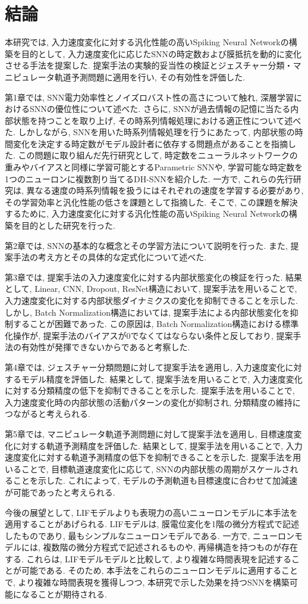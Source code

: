 \cleardoublepage %
\chapter{結論}

本研究では, 入力速度変化に対する汎化性能の高いSpiking Neural Networkの構築を目的として, 入力速度変化に応じたSNNの時定数および膜抵抗を動的に変化させる手法を提案した.
提案手法の実験的妥当性の検証とジェスチャー分類・マニピュレータ軌道予測問題に適用を行い, その有効性を評価した.

第1章では, SNN電力効率性とノイズロバスト性の高さについて触れ, 深層学習におけるSNNの優位性について述べた.
さらに, SNNが過去情報の記憶に当たる内部状態を持つことを取り上げ, その時系列情報処理における適正性について述べた.
しかしながら, SNNを用いた時系列情報処理を行うにあたって, 内部状態の時間変化を決定する時定数がモデル設計者に依存する問題点があることを指摘した.
この問題に取り組んだ先行研究として, 時定数をニューラルネットワークの重みやバイアスと同様に学習可能とするParametric SNNや, 学習可能な時定数を1つのニューロンに複数割り当てるDH-SNNを紹介した.
一方で, これらの先行研究は, 異なる速度の時系列情報を扱うにはそれぞれの速度を学習する必要があり, その学習効率と汎化性能の低さを課題として指摘した.
そこで, この課題を解決するために, 入力速度変化に対する汎化性能の高いSpiking Neural Networkの構築を目的とした研究を行った.

第2章では, SNNの基本的な概念とその学習方法について説明を行った.
また, 提案手法の考え方とその具体的な定式化について述べた.

第3章では, 提案手法の入力速度変化に対する内部状態変化の検証を行った.
結果として, Linear, CNN, Dropout, ResNet構造において, 提案手法を用いることで, 入力速度変化に対する内部状態ダイナミクスの変化を抑制できることを示した.
しかし, Batch Normalization構造においては, 提案手法による内部状態変化を抑制することが困難であった.
この原因は, Batch Normalization構造における標準化操作が, 提案手法のバイアスが0でなくてはならない条件と反しており, 提案手法の有効性が発揮できないからであると考察した.

第4章では, ジェスチャー分類問題に対して提案手法を適用し, 入力速度変化に対するモデル精度を評価した.
結果として, 提案手法を用いることで, 入力速度変化に対する分類精度の低下を抑制できることを示した.
提案手法を用いることで, 入力速度変化時の内部状態の活動パターンの変化が抑制され, 分類精度の維持につながると考えられる.

第5章では, マニピュレータ軌道予測問題に対して提案手法を適用し, 目標速度変化に対する軌道予測精度を評価した.
結果として, 提案手法を用いることで, 入力速度変化に対する軌道予測精度の低下を抑制できることを示した.
提案手法を用いることで, 目標軌道速度変化に応じて, SNNの内部状態の周期がスケールされることを示した.
これによって, モデルの予測軌道も目標速度に合わせて加減速が可能であったと考えられる.

今後の展望として, LIFモデルよりも表現力の高いニューロンモデルに本手法を適用することがあげられる.
LIFモデルは, 膜電位変化を1階の微分方程式で記述したものであり, 最もシンプルなニューロンモデルである.
一方で, ニューロンモデルには, 複数階の微分方程式で記述されるものや, 再帰構造を持つものが存在する.
これらは, LIFモデルモデルと比較して, より複雑な時間表現を記述することが可能である.
そのため, 本手法をこれらのニューロンモデルに適用することで, より複雑な時間表現を獲得しつつ, 本研究で示した効果を持つSNNを構築可能になることが期待される.
